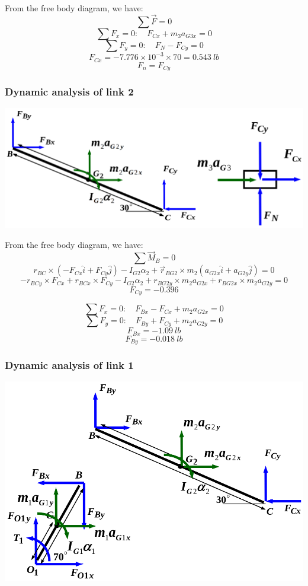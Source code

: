 \documentclass[11pt]{article}
\begin{document}
From the free body diagram, we have:
\[\sum \vec{F} = 0\]
\[\sum F_x = 0: \quad F_{Cx} + m_3 a_{G3x} = 0\]
\[\sum F_y = 0: \quad F_N - F_{Cy} = 0\]
\[F_{Cx} = - 7.776 \times 10^{-3} \times 70 = \qty{0.543}{lb}\]
\[F_n = F_{Cy}\]
\subsubsection{Dynamic analysis of link 2}
\label{sec:org0a908cc}
\begin{center}
\includegraphics[width=.9\linewidth]{./images/dynamic-force-analysis-example-2-link-2-free-body-diagram.png}
\end{center}

From the free body diagram, we have:
\[\sum \vec{M}_B = 0\]
\[r_{BC} \times (- F_{Cx} \hat{i} + F_{Cy} \hat{j}) - I_{G2} \alpha_2 + \vec{r}_{BG2} \times m_2 (a_{G2x} \hat{i} + a_{G2y} \hat{j}) = 0\]
\[- r_{BCy} \times F_{Cx} + r_{BCx} \times F_{Cy} - I_{G2} \alpha_2 + r_{BG2y} \times m_2 a_{G2x} + r_{BG2x} \times m_2 a_{G2y} = 0\]
\[F_{Cy} = - 0.396\]

\[\sum F_x = 0: \quad F_{Bx} - F_{Cx} + m_2 a_{G2x} = 0\]
\[\sum F_y = 0: \quad F_{By} + F_{Cy} + m_2 a_{G2y} = 0\]
\[F_{Bx} = \qty{-1.09}{lb}\]
\[F_{By} = \qty{-0.018}{lb}\]
\subsubsection{Dynamic analysis of link 1}
\label{sec:org4571d84}
\begin{center}
\includegraphics[width=.9\linewidth]{./images/dynamic-force-analysis-example-2-link-1-free-body-diagram.png}
\end{center}
\end{document}

